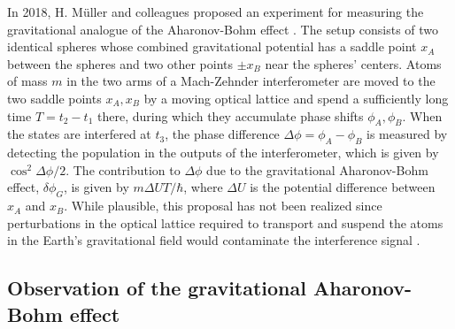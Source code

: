 \documentclass[reprint,
nofootinbib,
amsmath,amssymb,
aps]{revtex4-1}
\begin{document}
In 2018, H. M\"{u}ller and colleagues proposed an experiment for measuring the gravitational analogue of the Aharonov-Bohm effect \cite{hohensee2012force}. The setup  
consists of two identical spheres whose combined gravitational potential has a saddle point $x_A$ between the spheres and two other points $\pm x_B$ near the spheres' centers. Atoms of mass $m$ in the two arms of a Mach-Zehnder interferometer are moved to the two saddle points $x_A,x_B$ by a moving optical lattice and spend a sufficiently long time $T = t_2- t_1$ there, during which they accumulate phase shifts $\phi_A, \phi_B$. When the states are interfered at $t_3$, the phase difference $\Delta \phi = \phi_A - \phi_B$ is measured by detecting the population in the outputs of the interferometer, which is given by $\cos^2\Delta \phi/2$. The contribution to $\Delta \phi$ due to the gravitational Aharonov-Bohm effect, $\delta \phi_G$, is given by $m\Delta U T/\hbar$, where $\Delta U$ is the potential difference between $x_A$ and $x_B$.  While plausible, this proposal has not been realized since perturbations in the optical lattice required to transport and suspend the atoms in the Earth's gravitational field would contaminate the interference signal \cite{roura2022quantum}.  










\subsection{Observation of the gravitational Aharonov-Bohm effect}
\end{document}
